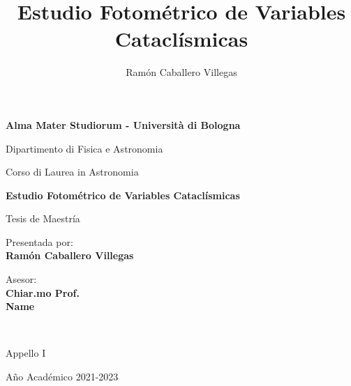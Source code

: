 \documentclass[12pt,a4paper]{report}
\newcommand{\ag}{\`a}
\begin{document}
\title{Estudio Fotométrico de Variables Cataclísmicas}
\author{Ramón Caballero Villegas}

\begin{titlepage}
    \begin{center}
        \vspace*{0.2cm}
        {\fontsize{19pt}{20pt}\selectfont \textbf{Alma Mater Studiorum - Universit{\ag} di Bologna}\par}
    
        \noindent\hrulefill
        \vspace{0.8cm}
        
        \Large
        
        Dipartimento di Fisica e Astronomia
        
        Corso di Laurea in Astronomia
        
        \Large
        \vspace{5cm}
        {\fontsize{22.5pt}{22.5}\textcolor{MyDarkBlue}{\textbf{Estudio Fotométrico de Variables Cataclísmicas}}}

        
        \vspace{1cm}
        {\fontsize{16pt}{16pt}Tesis de Maestría}
        
        \vspace{4.5cm}
        \begin{minipage}[t]{0.34\textwidth}
        \begin{flushleft}
        {\fontsize{16pt}{16pt}Presentada por: \\ \textbf{\textcolor{MyDarkBlue}{Ramón Caballero Villegas}}}
        \end{flushleft}
        \end{minipage}
        \begin{minipage}[t]{0.64\textwidth}
        \begin{flushright} \Large
        Asesor: \\
        \textbf{\textcolor{MyDarkBlue}{Chiar.mo Prof.}} 
		\\\textbf{\textcolor{MyDarkBlue}{Name}} 
        \end{flushright}
        \end{minipage}\\
        
        \vfill
        \noindent\hrulefill
        \vspace{0.3cm}
        \Large
        
        Appello {\textcolor{MyDarkBlue} {I}} 
        
        Año Académico {\textcolor{MyDarkBlue} {2021-2023}}
    \end{center}
\end{titlepage}
\end{document}
